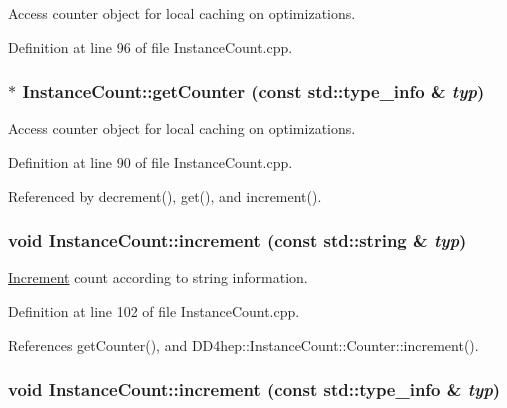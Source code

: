 Access counter object for local caching on optimizations. 

Definition at line 96 of file InstanceCount.cpp.\hypertarget{struct_d_d4hep_1_1_instance_count_a439db48975fe6b4e193a7ff40bc96bc6}{
\subsubsection[{getCounter}]{ $\ast$ InstanceCount::getCounter (const std::type\_\-info \& {\em typ})}}
\label{struct_d_d4hep_1_1_instance_count_a439db48975fe6b4e193a7ff40bc96bc6}


Access counter object for local caching on optimizations. 

Definition at line 90 of file InstanceCount.cpp.

Referenced by decrement(), get(), and increment().\hypertarget{struct_d_d4hep_1_1_instance_count_a2a6c1324b3462dcd26a7916d6b1ece46}{
\subsubsection[{increment}]{\setlength{\rightskip}{0pt plus 5cm}void InstanceCount::increment (const std::string \& {\em typ})}}
\label{struct_d_d4hep_1_1_instance_count_a2a6c1324b3462dcd26a7916d6b1ece46}


\hyperlink{struct_d_d4hep_1_1_increment}{Increment} count according to string information. 

Definition at line 102 of file InstanceCount.cpp.

References getCounter(), and DD4hep::InstanceCount::Counter::increment().\hypertarget{struct_d_d4hep_1_1_instance_count_a615e3109fee2bdd67d047d4decca1c0f}{
\subsubsection[{increment}]{\setlength{\rightskip}{0pt plus 5cm}void InstanceCount::increment (const std::type\_\-info \& {\em typ})}}
\label{struct_d_d4hep_1_1_instance_count_a615e3109fee2bdd67d047d4decca1c0f}


